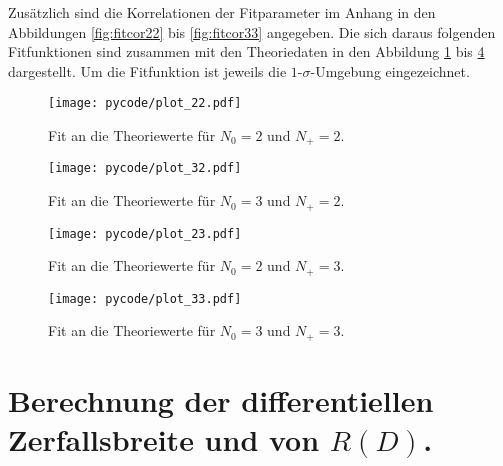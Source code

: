 Zusätzlich sind die Korrelationen der Fitparameter im Anhang in den Abbildungen \ref{fig:fitcor22} bis \ref{fig:fitcor33} angegeben.
Die sich daraus folgenden Fitfunktionen sind zusammen mit den Theoriedaten in den Abbildung \ref{fig:fit22} bis \ref{fig:fit33} dargestellt.
Um die Fitfunktion ist jeweils die $\num{1}$-$\sigma$-Umgebung eingezeichnet.
\begin{figure}
  \centering
  \texttt{[image: pycode/plot\_22.pdf]}
  \caption{Fit an die Theoriewerte für $N_0 = \num{2}$ und $N_+ = \num{2}$.}
  \label{fig:fit22}
\end{figure}
\begin{figure}
  \centering
  \texttt{[image: pycode/plot\_32.pdf]}
  \caption{Fit an die Theoriewerte für $N_0 = \num{3}$ und $N_+ = \num{2}$.}
  \label{fig:fit32}
\end{figure}
\begin{figure}
  \centering
  \texttt{[image: pycode/plot\_23.pdf]}
  \caption{Fit an die Theoriewerte für $N_0 = \num{2}$ und $N_+ = \num{3}$.}
  \label{fig:fit23}
\end{figure}
\begin{figure}
  \centering
  \texttt{[image: pycode/plot\_33.pdf]}
  \caption{Fit an die Theoriewerte für $N_0 = \num{3}$ und $N_+ = \num{3}$.}
  \label{fig:fit33}
\end{figure}

\section{Berechnung der differentiellen Zerfallsbreite und von \texorpdfstring{$R(D)$}{R(D)}.}

